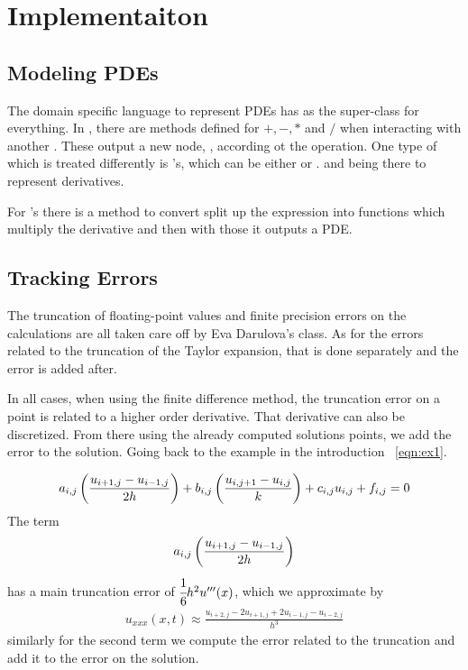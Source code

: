 \section{Implementaiton}
\subsection{Modeling PDEs}
The domain specific language to represent PDEs has 
as the super-class for everything. In , there are
methods defined for $+, -, *$ and $/$ when interacting with another
.  These output a new node, , according ot the operation. One type of 
which is treated differently is 's, which can
be either  or .  and
 being there to represent derivatives.

For 's there is a method \verba{:=} to convert split
up the expression into functions which multiply the derivative and
then with those it outputs a PDE.

\subsection{Tracking Errors}
The truncation of floating-point values and finite precision errors on the calculations are all
taken care off by Eva Darulova's 
class\cite{darulova}. As for the errors related to the truncation of
the Taylor expansion, that is done separately and the error is added
after.

In all cases, when using the finite difference method, the truncation
error on a point is related to a higher order derivative. That
derivative can also be discretized. From there using the already
computed solutions points, we add the error to the solution. Going
back to the example in the introduction ~\ref{eqn:ex1}.

\begin{align*}
    a_{i, j}\left(\frac{u_{i+1, j} - u_{i-1, j}}{2h}\right) +  b_{i,
        j}\left(\frac{u_{i, j+1} - u_{i, j}}{k}\right) + c_{i, j}u_{i, j}
    + f_{i, j} = 0
\end{align*}
The term
\begin{align*}
    a_{i, j}\left(\frac{u_{i+1, j} - u_{i-1, j}}{2h}\right)
\end{align*}
has a main truncation error of $\cfrac{1}{6}h^2u'''(x)$, which we
approximate by
\begin{align*}
    u_{xxx}(x, t)\approx\frac{u_{i+2, j} - 2u_{i+1, j}+2u_{i-1, j}- u_{i-2, j}}{h^3}
\end{align*}
similarly for the second term we compute the error related to the
truncation and add it to the error on the solution.

